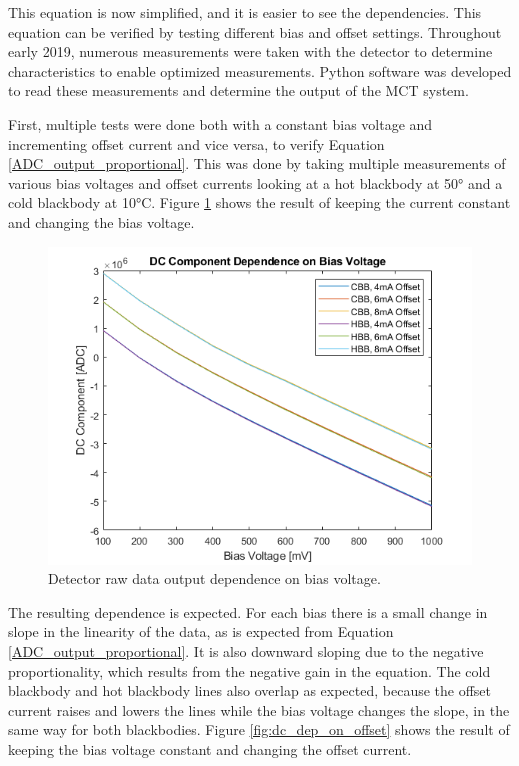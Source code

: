This equation is now simplified, and it is easier to see the dependencies. This equation can be verified by testing different bias and offset settings. Throughout early 2019, numerous measurements were taken with the detector to determine characteristics to enable optimized measurements. Python software was developed to read these measurements and determine the output of the MCT system. 

First, multiple tests were done both with a constant bias voltage and incrementing offset current and vice versa, to verify Equation \ref{ADC_output_proportional}. This was done by taking multiple measurements of various bias voltages and offset currents looking at a hot blackbody at 50° and a cold blackbody at 10°C. Figure \ref{fig:dc_dep_on_bias} shows the result of keeping the current constant and changing the bias voltage.

\begin{figure}[h]
  \includegraphics[width=\linewidth]{chap6_images/verification/dc_component_dependence_on_bias_voltage.png}
  \caption{Detector raw data output dependence on bias voltage.}
  \label{fig:dc_dep_on_bias}
\end{figure}

The resulting dependence is expected. For each bias there is a small change in slope in the linearity of the data, as is expected from Equation \ref{ADC_output_proportional}. It is also downward sloping due to the negative proportionality, which results from the negative gain in the equation. The cold blackbody and hot blackbody lines also overlap as expected, because the offset current raises and lowers the lines while the bias voltage changes the slope, in the same way for both blackbodies. Figure \ref{fig:dc_dep_on_offset} shows the result of keeping the bias voltage constant and changing the offset current.


